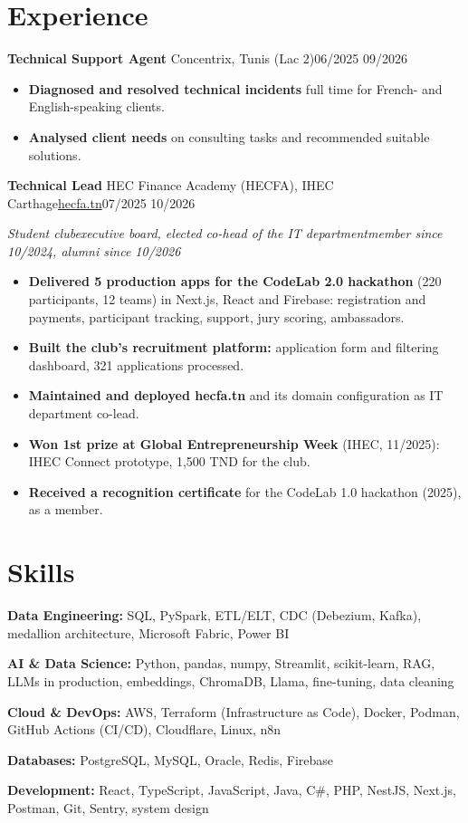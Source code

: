 \documentclass[10pt]{article}
\newcommand{\entry}[3]{\par\vspace{2pt}\textbf{#1}#2\hfill{\color{soft}#3}\par}
\newcommand{\sub}[1]{{\itshape\color{soft}#1\par}}
\newcommand{\sep}{\enspace\textperiodcentered\enspace}
\begin{document}
\section{Experience}
\entry{Technical Support Agent}{ \textendash{} Concentrix, Tunis (Lac 2)}{06/2025 \textendash{} 09/2026}
\begin{itemize}
\item \textbf{Diagnosed and resolved technical incidents} full time for French- and English-speaking clients.
\item \textbf{Analysed client needs} on consulting tasks and recommended suitable solutions.
\end{itemize}
\entry{Technical Lead}{ \textendash{} HEC Finance Academy (HECFA), IHEC Carthage\sep \href{https://hecfa.tn}{hecfa.tn}}{07/2025 \textendash{} 10/2026}
\sub{Student club\sep executive board, elected co-head of the IT department\sep member since 10/2024, alumni since 10/2026}
\begin{itemize}
\item \textbf{Delivered 5 production apps for the CodeLab 2.0 hackathon} (220 participants, 12 teams) in Next.js, React and Firebase: registration and payments, participant tracking, support, jury scoring, ambassadors.
\item \textbf{Built the club's recruitment platform:} application form and filtering dashboard, 321 applications processed.
\item \textbf{Maintained and deployed hecfa.tn} and its domain configuration as IT department co-lead.
\item \textbf{Won 1st prize at Global Entrepreneurship Week} (IHEC, 11/2025): IHEC Connect prototype, 1,500 TND for the club.
\item \textbf{Received a recognition certificate} for the CodeLab 1.0 hackathon (2025), as a member.
\end{itemize}
\section{Skills}
\textbf{Data Engineering:} SQL, PySpark, ETL/ELT, CDC (Debezium, Kafka), medallion architecture, Microsoft Fabric, Power BI\par
\textbf{AI \& Data Science:} Python, pandas, numpy, Streamlit, scikit-learn, RAG, LLMs in production, embeddings, ChromaDB, Llama, fine-tuning, data cleaning\par
\textbf{Cloud \& DevOps:} AWS, Terraform (Infrastructure as Code), Docker, Podman, GitHub Actions (CI/CD), Cloudflare, Linux, n8n\par
\textbf{Databases:} PostgreSQL, MySQL, Oracle, Redis, Firebase\par
\textbf{Development:} React, TypeScript, JavaScript, Java, C\#, PHP, NestJS, Next.js, Postman, Git, Sentry, system design\par
\end{document}
